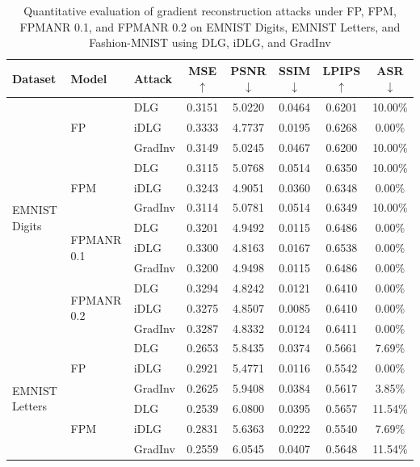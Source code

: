 \documentclass[a4paper,fleqn]{cas-dc}
\begin{document}
\begin{table}
\centering
\scriptsize
\caption{Quantitative evaluation of gradient reconstruction attacks under FP, FPM, FPMANR 0.1, and FPMANR 0.2 on EMNIST Digits, EMNIST Letters, and Fashion-MNIST using DLG, iDLG, and GradInv}
\label{tab:1}
\begin{tabular}{l l l c c c c c}
\toprule
\textbf{Dataset} & \textbf{Model} & \textbf{Attack} & \textbf{MSE $\uparrow$} & \textbf{PSNR $\downarrow$} & \textbf{SSIM $\downarrow$} & \textbf{LPIPS $\uparrow$} & \textbf{ASR $\downarrow$} \\
\midrule
\multirow{12}{*}{EMNIST Digits} & \multirow{3}{*}{FP} & DLG & 0.3151 & 5.0220 & 0.0464 & 0.6201 & 10.00\% \\
 &  & iDLG & 0.3333 & 4.7737 & 0.0195 & 0.6268 & 0.00\% \\
 &  & GradInv & 0.3149 & 5.0245 & 0.0467 & 0.6200 & 10.00\% \\
 & \multirow{3}{*}{FPM} & DLG & 0.3115 & 5.0768 & 0.0514 & 0.6350 & 10.00\% \\
 &  & iDLG & 0.3243 & 4.9051 & 0.0360 & 0.6348 & 0.00\% \\
 &  & GradInv & 0.3114 & 5.0781 & 0.0514 & 0.6349 & 10.00\% \\
 & \multirow{3}{*}{FPMANR 0.1} & DLG & 0.3201 & 4.9492 & 0.0115 & 0.6486 & 0.00\% \\
 &  & iDLG & 0.3300 & 4.8163 & 0.0167 & 0.6538 & 0.00\% \\
 &  & GradInv & 0.3200 & 4.9498 & 0.0115 & 0.6486 & 0.00\% \\
 & \multirow{3}{*}{FPMANR 0.2} & DLG & 0.3294 & 4.8242 & 0.0121 & 0.6410 & 0.00\% \\
 &  & iDLG & 0.3275 & 4.8507 & 0.0085 & 0.6410 & 0.00\% \\
 &  & GradInv & 0.3287 & 4.8332 & 0.0124 & 0.6411 & 0.00\% \\
\midrule
\multirow{12}{*}{EMNIST Letters} & \multirow{3}{*}{FP} & DLG & 0.2653 & 5.8435 & 0.0374 & 0.5661 & 7.69\% \\
 &  & iDLG & 0.2921 & 5.4771 & 0.0116 & 0.5542 & 0.00\% \\
 &  & GradInv & 0.2625 & 5.9408 & 0.0384 & 0.5617 & 3.85\% \\
 & \multirow{3}{*}{FPM} & DLG & 0.2539 & 6.0800 & 0.0395 & 0.5657 & 11.54\% \\
 &  & iDLG & 0.2831 & 5.6363 & 0.0222 & 0.5540 & 7.69\% \\
 &  & GradInv & 0.2559 & 6.0545 & 0.0407 & 0.5648 & 11.54\% \\

\end{tabular}
\end{table}
\end{document}
